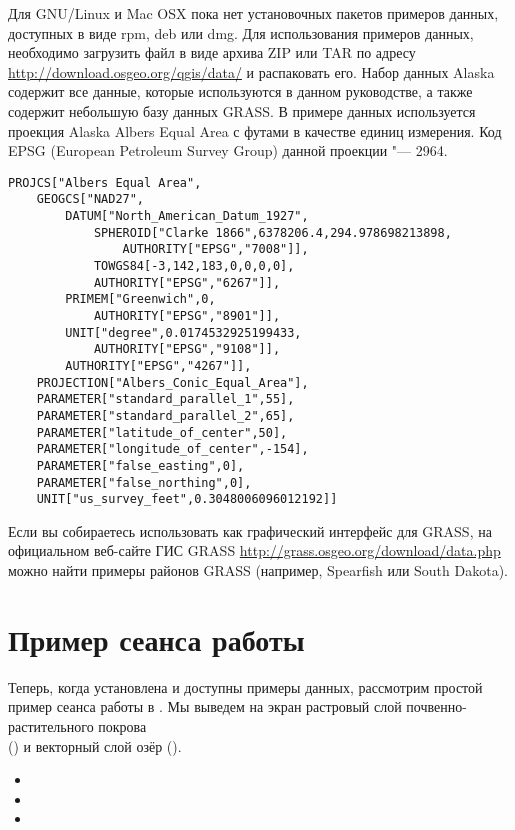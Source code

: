 \nix \osx Для GNU/Linux и Mac OSX пока нет установочных пакетов
примеров данных, доступных в виде rpm, deb или dmg. Для использования
примеров данных, необходимо загрузить файл 
в виде архива ZIP или TAR по адресу
\url{http://download.osgeo.org/qgis/data/} и распаковать его. Набор
данных Alaska содержит все данные, которые используются в данном руководстве,
а также содержит небольшую базу данных GRASS. В примере данных используется
проекция Alaska Albers Equal Area с футами в качестве единиц измерения.
Код EPSG (European Petroleum Survey Group) данной проекции "--- 2964.

\begin{verbatim}
PROJCS["Albers Equal Area",
    GEOGCS["NAD27",
        DATUM["North_American_Datum_1927",
            SPHEROID["Clarke 1866",6378206.4,294.978698213898,
                AUTHORITY["EPSG","7008"]],
            TOWGS84[-3,142,183,0,0,0,0],
            AUTHORITY["EPSG","6267"]],
        PRIMEM["Greenwich",0,
            AUTHORITY["EPSG","8901"]],
        UNIT["degree",0.0174532925199433,
            AUTHORITY["EPSG","9108"]],
        AUTHORITY["EPSG","4267"]],
    PROJECTION["Albers_Conic_Equal_Area"],
    PARAMETER["standard_parallel_1",55],
    PARAMETER["standard_parallel_2",65],
    PARAMETER["latitude_of_center",50],
    PARAMETER["longitude_of_center",-154],
    PARAMETER["false_easting",0],
    PARAMETER["false_northing",0],
    UNIT["us_survey_feet",0.3048006096012192]]
\end{verbatim}

Если вы собираетесь использовать \qg как графический интерфейс для
GRASS, на официальном веб-сайте ГИС GRASS
\url{http://grass.osgeo.org/download/data.php} можно найти примеры
районов GRASS (например, Spearfish или South Dakota).

\section{Пример сеанса работы}\label{samplesession}

Теперь, когда \qg установлена и доступны примеры данных, рассмотрим
простой пример сеанса работы в \qg. Мы выведем на экран растровый слой
почвенно-растительного покрова \\
() и векторный
слой озёр ().


\begin{itemize}[label=--]
\item {}
\item {}
\item {}
\end{itemize}


